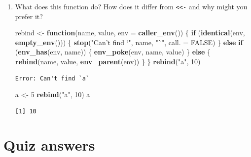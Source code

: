 \documentclass[]{book}
\newenvironment{Shaded}{\begin{snugshade}}{\end{snugshade}}
\newcommand{\ControlFlowTok}[1]{\textcolor[rgb]{0.13,0.29,0.53}{\textbf{#1}}}
\newcommand{\DataTypeTok}[1]{\textcolor[rgb]{0.13,0.29,0.53}{#1}}
\newcommand{\DecValTok}[1]{\textcolor[rgb]{0.00,0.00,0.81}{#1}}
\newcommand{\KeywordTok}[1]{\textcolor[rgb]{0.13,0.29,0.53}{\textbf{#1}}}
\newcommand{\NormalTok}[1]{#1}
\newcommand{\OtherTok}[1]{\textcolor[rgb]{0.56,0.35,0.01}{#1}}
\newcommand{\StringTok}[1]{\textcolor[rgb]{0.31,0.60,0.02}{#1}}
\theoremstyle{definition}
\theoremstyle{definition}
\theoremstyle{definition}
\theoremstyle{remark}
\begin{document}
\begin{enumerate}
\def\labelenumi{\arabic{enumi}.}
\item
  What does this function do? How does it differ from
  \texttt{\textless{}\textless{}-} and why might you prefer it?

\begin{Shaded}
\begin{Highlighting}[]
\NormalTok{rebind <-}\StringTok{ }\ControlFlowTok{function}\NormalTok{(name, value, }\DataTypeTok{env =} \KeywordTok{caller_env}\NormalTok{()) \{}
  \ControlFlowTok{if}\NormalTok{ (}\KeywordTok{identical}\NormalTok{(env, }\KeywordTok{empty_env}\NormalTok{())) \{}
    \KeywordTok{stop}\NormalTok{(}\StringTok{"Can't find `"}\NormalTok{, name, }\StringTok{"`"}\NormalTok{, }\DataTypeTok{call. =} \OtherTok{FALSE}\NormalTok{)}
\NormalTok{  \} }\ControlFlowTok{else} \ControlFlowTok{if}\NormalTok{ (}\KeywordTok{env_has}\NormalTok{(env, name)) \{}
    \KeywordTok{env_poke}\NormalTok{(env, name, value)}
\NormalTok{  \} }\ControlFlowTok{else}\NormalTok{ \{}
    \KeywordTok{rebind}\NormalTok{(name, value, }\KeywordTok{env_parent}\NormalTok{(env))}
\NormalTok{  \}}
\NormalTok{\}}
\KeywordTok{rebind}\NormalTok{(}\StringTok{"a"}\NormalTok{, }\DecValTok{10}\NormalTok{)}
\end{Highlighting}
\end{Shaded}

\begin{verbatim}
Error: Can't find `a`
\end{verbatim}

\begin{Shaded}
\begin{Highlighting}[]
\NormalTok{a <-}\StringTok{ }\DecValTok{5}
\KeywordTok{rebind}\NormalTok{(}\StringTok{"a"}\NormalTok{, }\DecValTok{10}\NormalTok{)}
\NormalTok{a}
\end{Highlighting}
\end{Shaded}

\begin{verbatim}
[1] 10
\end{verbatim}
\end{enumerate}

\hypertarget{env-answers}{%
\section{Quiz answers}\label{env-answers}}
\end{document}

